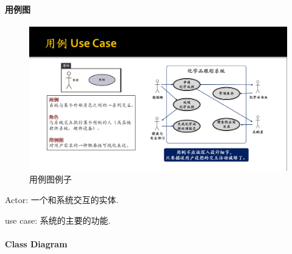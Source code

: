 \documentclass{ctexart}
\begin{document}
\paragraph{用例图}
    \begin{figure}[ht!]
        \centering
        \includegraphics[width=\textwidth, height=\textheight, keepaspectratio]{usecase.png}
        \caption{用例图例子}
    \end{figure}
    Actor: 一个和系统交互的实体.\par
    use case: 系统的主要的功能.\par
\paragraph{Class Diagram}
\end{document}
